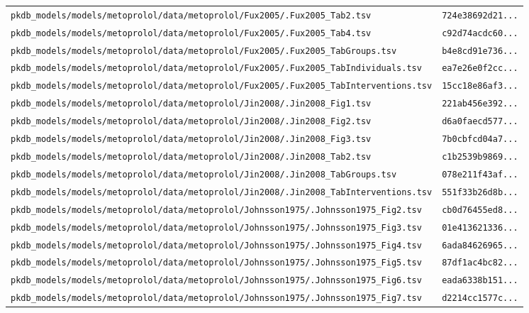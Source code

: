 \begin{longtable}{ll}
\texttt{pkdb\_models/models/metoprolol/data/metoprolol/Fux2005/.Fux2005\_Tab2.tsv} & \texttt{724e38692d21...} \\
\texttt{pkdb\_models/models/metoprolol/data/metoprolol/Fux2005/.Fux2005\_Tab4.tsv} & \texttt{c92d74acdc60...} \\
\texttt{pkdb\_models/models/metoprolol/data/metoprolol/Fux2005/.Fux2005\_TabGroups.tsv} & \texttt{b4e8cd91e736...} \\
\texttt{pkdb\_models/models/metoprolol/data/metoprolol/Fux2005/.Fux2005\_TabIndividuals.tsv} & \texttt{ea7e26e0f2cc...} \\
\texttt{pkdb\_models/models/metoprolol/data/metoprolol/Fux2005/.Fux2005\_TabInterventions.tsv} & \texttt{15cc18e86af3...} \\
\texttt{pkdb\_models/models/metoprolol/data/metoprolol/Jin2008/.Jin2008\_Fig1.tsv} & \texttt{221ab456e392...} \\
\texttt{pkdb\_models/models/metoprolol/data/metoprolol/Jin2008/.Jin2008\_Fig2.tsv} & \texttt{d6a0faecd577...} \\
\texttt{pkdb\_models/models/metoprolol/data/metoprolol/Jin2008/.Jin2008\_Fig3.tsv} & \texttt{7b0cbfcd04a7...} \\
\texttt{pkdb\_models/models/metoprolol/data/metoprolol/Jin2008/.Jin2008\_Tab2.tsv} & \texttt{c1b2539b9869...} \\
\texttt{pkdb\_models/models/metoprolol/data/metoprolol/Jin2008/.Jin2008\_TabGroups.tsv} & \texttt{078e211f43af...} \\
\texttt{pkdb\_models/models/metoprolol/data/metoprolol/Jin2008/.Jin2008\_TabInterventions.tsv} & \texttt{551f33b26d8b...} \\
\texttt{pkdb\_models/models/metoprolol/data/metoprolol/Johnsson1975/.Johnsson1975\_Fig2.tsv} & \texttt{cb0d76455ed8...} \\
\texttt{pkdb\_models/models/metoprolol/data/metoprolol/Johnsson1975/.Johnsson1975\_Fig3.tsv} & \texttt{01e413621336...} \\
\texttt{pkdb\_models/models/metoprolol/data/metoprolol/Johnsson1975/.Johnsson1975\_Fig4.tsv} & \texttt{6ada84626965...} \\
\texttt{pkdb\_models/models/metoprolol/data/metoprolol/Johnsson1975/.Johnsson1975\_Fig5.tsv} & \texttt{87df1ac4bc82...} \\
\texttt{pkdb\_models/models/metoprolol/data/metoprolol/Johnsson1975/.Johnsson1975\_Fig6.tsv} & \texttt{eada6338b151...} \\
\texttt{pkdb\_models/models/metoprolol/data/metoprolol/Johnsson1975/.Johnsson1975\_Fig7.tsv} & \texttt{d2214cc1577c...} \\

\end{longtable}

